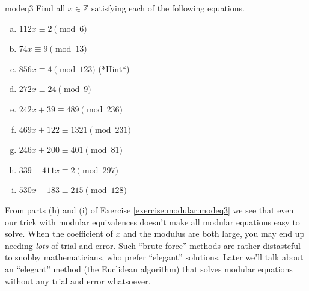 \begin{exercise}{modeq3}
Find all $x \in {\mathbb Z}$ satisfying each of the following equations.
\begin{multicols}{2}
\begin{enumerate}[(a)]
\item
$112x \equiv 2 \pmod{ 6}$
\item
$74x \equiv 9 \pmod{ 13}$
\item
$856x \equiv 4 \pmod{ 123}$ 
\hyperref[sec:modular_arithmetic:hints]{(*Hint*)}
\item
$272x \equiv 24 \pmod{ 9}$
\item
$242x + 39 \equiv 489 \pmod{236}$
\item
$469x + 122 \equiv 1321 \pmod{ 231}$
\item
$246x + 200 \equiv 401 \pmod{ 81}$
\item
$339 + 411x \equiv 2 \pmod{ 297}$
\item
$530x - 183 \equiv 215 \pmod{ 128}$ 
\end{enumerate}
\end{multicols}
\end{exercise}

From parts (h) and (i) of Exercise \ref{exercise:modular:modeq3} we see that even our trick with modular equivalences doesn't make all modular equations easy to solve.  When the coefficient of $x$ and the modulus are both large, you may end up needing \emph{lots} of trial and error. Such ``brute force'' methods are rather distasteful to snobby mathematicians, who prefer ``elegant'' solutions.  Later we'll talk about an ``elegant''  method (the Euclidean algorithm) that solves  modular equations without any trial and error whatsoever.




